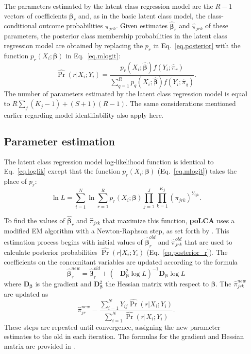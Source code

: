 \documentclass[letterpaper,12pt]{article}
\begin{document}
The parameters estimated by the latent class regression model are the $R-1$ vectors of coefficients $\boldsymbol \beta_r$ and, as in the basic latent class model, the class-conditional outcome probabilities $\pi_{jrk}$. Given estimates $\boldsymbol{\hat \beta}_r$ and $\hat \pi_{jrk}$ of these parameters, the posterior class membership probabilities in the latent class regression model are obtained by replacing the $p_r$ in Eq.~\ref{eq.posterior} with the function $p_r(X_i;\boldsymbol \beta)$ in Eq.~\ref{eq.mlogit}:
\begin{equation}
\widehat{\Pr}(r|X_i; Y_i) =\frac{p_r(X_i;\boldsymbol{\hat \beta})
f(Y_i;\hat \pi_r)}{\sum_{q=1}^R p_q(X_i;\boldsymbol{\hat \beta})
f(Y_i;\hat \pi_q)}. \label{eq.posterior_r}
\end{equation}
The number of parameters estimated by the latent class regression model is equal to $R \sum_j (K_j-1) + (S+1)(R-1)$. The same considerations mentioned earlier regarding model identifiability also apply here.

\subsection{Parameter estimation}

The latent class regression model log-likelihood function is identical to Eq.~\ref{eq.loglik} except that the function $p_r(X_i;\boldsymbol \beta)$ (Eq.~\ref{eq.mlogit}) takes the place
of $p_r$:
\begin{equation}
\ln L = \sum_{i=1}^N \ln \sum_{r=1}^R p_r(X_i;\boldsymbol \beta)
\prod_{j=1}^J \prod_{k=1}^{K_j} (\pi_{jrk})^{Y_{ijk}}.
\label{eq.loglik_r}
\end{equation}

To find the values of $\boldsymbol{\hat \beta}_r$ and $\hat \pi_{jrk}$ that maximize this function, \textbf{poLCA} uses a modified EM algorithm with a Newton-Raphson step, as set forth by \citet{BRMZR1997}. This estimation process begins with initial values of $\boldsymbol{\hat \beta}_r^{old}$ and $\hat \pi_{jrk}^{old}$ that are used to calculate posterior probabilities $\widehat{\Pr}(r|X_i; Y_i)$ (Eq.~\ref{eq.posterior_r}).  The coefficients on the concomitant variables are updated according to the formula
\begin{equation}
\boldsymbol{\hat \beta}_r^{new} = \boldsymbol{\hat \beta}_r^{old} +
(- \mathbf D_{\boldsymbol \beta}^2 \log L)^{-1} \mathbf
D_{\boldsymbol \beta} \log L
\end{equation}
where \textbf{D}$_{\boldsymbol \beta}$ is the gradient and \textbf{D}$_{\boldsymbol \beta}^2$ the Hessian matrix with respect to $\boldsymbol \beta$. The $\hat \pi_{jrk}^{new}$ are updated as
\begin{equation}
\hat{\pi}_{jr}^{new} = \frac{\sum_{i=1}^N Y_{ij}
\widehat{\Pr}(r|X_i; Y_i)}{\sum_{i=1}^N \widehat{\Pr}(r|X_i; Y_i)}.
\end{equation}
These steps are repeated until convergence, assigning the new parameter estimates to the old in each iteration.  The formulas for the gradient and Hessian matrix are provided in \citet{BRMZR1997}.
\end{document}
